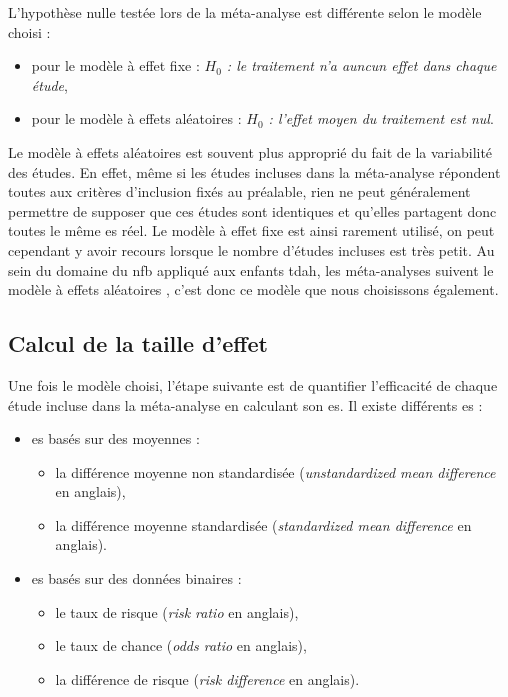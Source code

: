 L'hypothèse nulle testée lors de la méta-analyse est différente selon le modèle choisi :
\begin{itemize}
\item pour le modèle à effet fixe : 
\textit{$H_{0}$ : le traitement n'a auncun effet dans chaque étude},
\item pour le modèle à effets aléatoires : 
\textit{$H_{0}$ : l'effet moyen du traitement est nul}.
\end{itemize}

Le modèle à effets aléatoires est souvent plus approprié du fait de la variabilité des études. En effet, même si les études incluses dans la méta-analyse 
répondent toutes aux critères d'inclusion fixés au préalable, rien ne peut généralement permettre de supposer que ces études sont identiques et qu'elles 
partagent donc toutes le même \gls{es} réel. Le modèle à effet fixe est ainsi rarement utilisé, on peut cependant y avoir recours lorsque le nombre d'études incluses 
est très petit. Au sein du domaine du \gls{nfb} appliqué aux enfants \gls{tdah}, les méta-analyses suivent le modèle à effets aléatoires 
\citep{Cortese2016, Micoulaud2014}, c'est donc ce modèle que nous choisissons également.

\subsection{Calcul de la taille d'effet}

Une fois le modèle choisi, l'étape suivante est de quantifier l'efficacité de chaque étude incluse dans la méta-analyse en calculant son \gls{es}. 
Il existe différents \gls{es} \citep{Borenstein2009} :
\renewcommand{\labelitemi}{$\bullet$}
\renewcommand{\labelitemii}{$\cdot$}
\begin{itemize}
\item \gls{es} basés sur des moyennes :
\begin{itemize}
    \item la différence moyenne non standardisée (\textit{unstandardized mean difference} en anglais),
    \item la différence moyenne standardisée (\textit{standardized mean difference} en anglais).
\end{itemize}
\item \gls{es} basés sur des données binaires :
\begin{itemize}
    \item le taux de risque (\textit{risk ratio} en anglais),
    \item le taux de chance (\textit{odds ratio} en anglais),
		\item la différence de risque (\textit{risk difference} en anglais).
\end{itemize}
\end{itemize}

